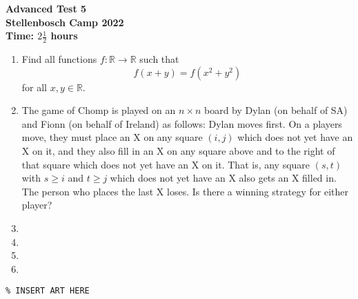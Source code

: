\documentclass{article}
\begin{document}
\thispagestyle{empty}

\begin{center}
  \textbf{\Large Advanced Test 5}
  \\ \vspace{1em}
  \textbf{\large Stellenbosch Camp 2022}
  \\ \vspace{1em}
  \textbf{\large Time: $2\frac{1}{2}$ hours}
\end{center}

\bigskip \bigskip

\begin{enumerate}[itemsep=\fill]

\item %
Find all functions $f : \mathbb{R} \to \mathbb{R}$ such that \[ f(x+y) = f(x^2+y^2) \] for all $x,y \in \mathbb{R}$.

 
\item %
The game of Chomp is played on an $n \times n$ board by Dylan (on behalf of SA) and Fionn (on behalf of Ireland) as follows: Dylan moves first. On a players move, they must place an X on any square $(i, j)$ which does not yet have an X on it, and they also fill in an X on any square above and to the right of that square which does not yet have an X on it. That is, any square $(s, t)$ with $s \geq i$ and $t \geq j$ which does not yet have an X also gets an X filled in. The person who places the last X loses. Is there a winning strategy for either player?


\item %


\item %


\item %


\item %

\end{enumerate}


\vfill
\centering
\small
\begin{BVerbatim}
\end{BVerbatim}
\end{document}
